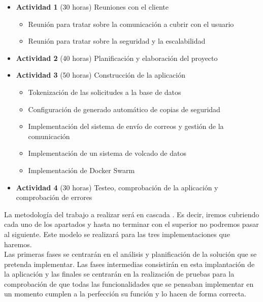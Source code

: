 \begin{itemize}
    \item \textbf{Actividad 1} (30 horas) Reuniones con el cliente
          \begin{itemize}
              \item Reunión para tratar sobre la comunicación a cubrir con el usuario
              \item Reunión para tratar sobre la seguridad y la escalabilidad
          \end{itemize}
    \item \textbf{Actividad 2} (40 horas) Planificación y elaboración del proyecto
    \item \textbf{Actividad 3} (50 horas) Construcción de la aplicación
          \begin{itemize}
              \item Tokenización de las solicitudes a la base de datos
              \item Configuración de generado automático de copias de seguridad
              \item Implementación del sistema de envío de correos y gestión de la comunicación
              \item Implementación de un sistema de volcado de datos
              \item Implementación de Docker Swarm
          \end{itemize}
    \item \textbf{Actividad 4} (30 horas) Testeo, comprobación de la aplicación y comprobación de errores
\end{itemize}

La metodología del trabajo a realizar será en cascada \cite{waterfall-vs-agile}. Es decir, iremos cubriendo cada uno de los apartados y hasta no terminar con el superior no podremos pasar al siguiente. Este modelo se realizará para las tres implementaciones que haremos.
\\Las primeras fases se centrarán en el análisis y planificación de la solución que se pretenda implementar. Las fases intermedias consistirán en esta implantación de la aplicación y las finales se centrarán en la realización de pruebas para la comprobación de que todas las funcionalidades que se pensaban implementar en un momento cumplen a la perfección su función y lo hacen de forma correcta.